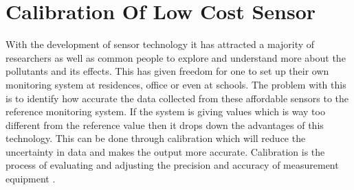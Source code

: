 \documentclass[11pt]{article}
\begin{document}
\section*{Calibration Of Low Cost Sensor}

With the development of sensor technology it has attracted a majority of researchers as well as common people to explore and understand more about the pollutants and its effects. This has given freedom for one to set up their own monitoring system at residences, office or even at schools. The problem with this is to identify how accurate the data collected from these affordable sensors to the reference monitoring system. If the system is giving values which is way too different from the reference value then it drops down the advantages of this technology. This can be done through calibration which will reduce the uncertainty in data and makes the output more accurate. Calibration is the process of evaluating and adjusting the precision and accuracy of measurement equipment \cite{Kejuruteraan2018}.
\end{document}
